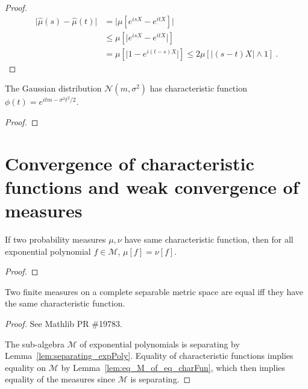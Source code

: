 \begin{proof}
\begin{align*}
\vert \hat{\mu}(s) - \hat{\mu}(t) \vert
&= \vert \mu\left[e^{isX} - e^{itX}\right] \vert
\\
&\le \mu\left[\vert e^{isX} - e^{itX} \vert\right]
\\
&= \mu\left[\vert 1 - e^{i(t - s)X} \vert\right]
\le 2 \mu\left[ \left\vert (s - t) X\right\vert \wedge 1\right]
\: .
\end{align*}
\end{proof}


\begin{lemma}\label{lem:gaussian_charFun}
\leanok
{}
The Gaussian distribution $\mathcal N(m, \sigma^2)$ has characteristic function $\phi(t) = e^{itm - \sigma^2 t^2 /2}$.
\end{lemma}

\begin{proof}\leanok
\end{proof}



\section{Convergence of characteristic functions and weak convergence of measures}


\begin{lemma}\label{lem:eq_M_of_eq_charFun}
If two probability measures $\mu, \nu$ have same characteristic function, then for all exponential polynomial $f \in \mathcal M$, $\mu[f] = \nu[f]$.
\end{lemma}

\begin{proof}
\end{proof}


\begin{lemma}\label{lem:ext_charFun}
\leanok
{}
Two finite measures on a complete separable metric space are equal iff they have the same characteristic function.
\end{lemma}

\begin{proof}
See Mathlib PR \#19783.

The sub-algebra $\mathcal M$ of exponential polynomials is separating by Lemma~\ref{lem:separating_expPoly}. Equality of characteristic functions implies equality on $\mathcal M$ by Lemma~\ref{lem:eq_M_of_eq_charFun}, which then implies equality of the measures since $\mathcal M$ is separating.
\end{proof}


